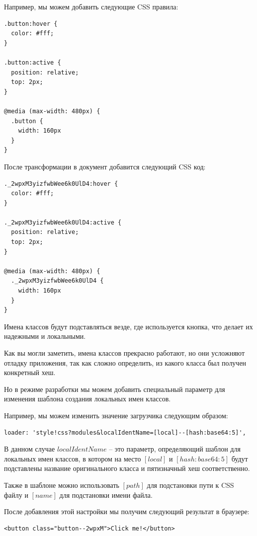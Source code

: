 Например, мы можем добавить следующие CSS правила:

\begin{lstlisting}
.button:hover {
  color: #fff;
}

.button:active {
  position: relative;
  top: 2px;
}

@media (max-width: 480px) {
  .button {
    width: 160px
  }
}
\end{lstlisting}

После трансформации в документ добавится следующий CSS код:

\begin{lstlisting}
._2wpxM3yizfwbWee6k0UlD4:hover {
  color: #fff;
}

._2wpxM3yizfwbWee6k0UlD4:active {
  position: relative;
  top: 2px;
}

@media (max-width: 480px) {
  ._2wpxM3yizfwbWee6k0UlD4 {
    width: 160px
  }
}
\end{lstlisting}

Имена классов будут подставляться везде, где используется кнопка, что делает их надежными и локальными.

Как вы могли заметить, имена классов прекрасно работают, но они усложняют отладку приложения, так как сложно определить, из какого класса был получен конкретный хеш.

Но в режиме разработки мы можем добавить специальный параметр для изменения шаблона создания локальных имен классов.

Например, мы можем изменить значение загрузчика следующим образом:

\begin{lstlisting}
loader: 'style!css?modules&localIdentName=[local]--[hash:base64:5]',
\end{lstlisting}

В данном случае $localIdentName$ -- это параметр, определяющий шаблон для локальных имен классов, в котором на место $[local]$ и $[hash:base64:5]$ будут подставлены название оригинального класса и пятизначный хеш соответственно.

Также в шаблоне можно использовать $[path]$ для подстановки пути к CSS файлу и $[name]$ для подстановки имени файла.

После добавления этой настройки мы получим следующий результат в браузере:

\begin{lstlisting}
<button class="button--2wpxM">Click me!</button>
\end{lstlisting}


